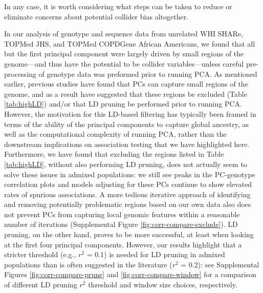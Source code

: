 \documentclass[12pt]{article}
\newcommand{\edit}[1]{{\color{red}{#1}}}
\begin{document}
In any case, it is worth considering what steps can be taken to reduce or eliminate concerns about potential collider bias altogether.

In our analysis of genotype and sequence data from unrelated WHI SHARe, TOPMed JHS, and TOPMed COPDGene African Americans, we found that all but the first principal component were largely driven by small regions of the genome---and thus have the potential to be collider variables---unless careful pre-processing of genotype data was preformed prior to running PCA.
As mentioned earlier, previous studies have found that PCs can capture small regions of the genome, and as a result have suggested that these regions be excluded (Table \ref{tab:highLD}) and/or that LD pruning be performed prior to running PCA.
However, the motivation for this LD-based filtering has typically been framed in terms of the ability of the principal components to capture global ancestry, as well as the computational complexity of running PCA, rather than the downstream implications on association testing that we have highlighted here.
Furthermore, we have found that excluding the regions listed in Table \ref{tab:highLD}, without also performing LD pruning, does not actually seem to solve these issues in admixed populations: we still see peaks in the PC-genotype correlation plots and models adjusting for these PCs continue to show elevated rates of spurious associations.
A more tedious iterative approach of identifying  and removing potentially problematic regions based on our own data also does not prevent PCs from capturing local genomic features within a reasonable number of iterations (Supplemental Figure \ref{fig:corr-compare-exclude}).
LD pruning, on the other hand, proves to be more successful, at least when looking at the first four principal components.
However, our results highlight that a stricter threshold (e.g., $r^2$ = 0.1) is needed for LD pruning in admixed populations than is often suggested in the literature ($r^2$ = 0.2): see Supplemental Figures \ref{fig:corr-compare-prune} and \ref{fig:corr-compare-window} for a comparison of different LD pruning $r^2$ threshold and window size choices, respectively.
\end{document}
